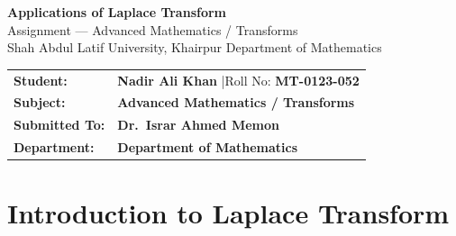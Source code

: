 \documentclass[12pt]{article}
\begin{document}
\thispagestyle{empty}

\begin{tcolorbox}[
  enhanced, arc=0pt, boxrule=0pt,
  colback=primary, colframe=primary,
  left=16pt, right=16pt, top=18pt, bottom=14pt,
  borderline south={4pt}{0pt}{accent},
]
  \centering
  {\huge\bfseries\color{white} Applications of Laplace Transform}\\[4pt]
  {\large\color{accent} Assignment --- Advanced Mathematics / Transforms}\\[6pt]
  {\normalsize\color{lightbg}
    Shah Abdul Latif University, Khairpur \quad\textbullet\quad Department of Mathematics}
\end{tcolorbox}

\vspace{4pt}

\begin{tcolorbox}[
  enhanced, arc=0pt, boxrule=0pt,
  colback=white, colframe=white,
  borderline north={1.5pt}{0pt}{accent!60},
  borderline south={1.5pt}{0pt}{accent!60},
  left=16pt, right=16pt, top=12pt, bottom=12pt,
]
  \begin{tabular}{p{3.8cm} p{9cm}}
    \textcolor{primary}{\textbf{Student:}}
      & \textbf{Nadir Ali Khan} \quad|\quad Roll No: \textbf{MT-0123-052} \\[4pt]
    \textcolor{primary}{\textbf{Subject:}}
      & \textbf{Advanced Mathematics / Transforms} \\[4pt]
    \textcolor{primary}{\textbf{Submitted To:}}
      & \textbf{Dr.\ Israr Ahmed Memon} \\[4pt]
    \textcolor{primary}{\textbf{Department:}}
      & \textbf{Department of Mathematics} \\
  \end{tabular}
\end{tcolorbox}

\vspace{10pt}

\renewcommand{\contentsname}{\color{primary}Table of Contents}
\tableofcontents

\newpage

\section{Introduction to Laplace Transform}
\end{document}
